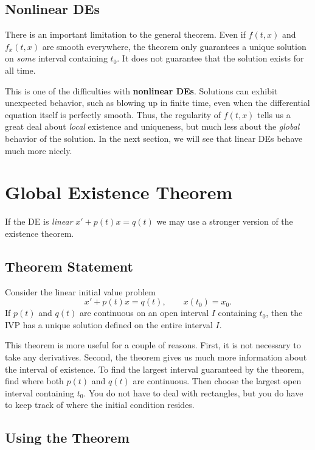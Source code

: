 \documentclass[11pt,letterpaper]{article}
\begin{document}
\subsection{Nonlinear DEs}

There is an important limitation to the general theorem. Even if $f(t,x)$
and $f_x(t,x)$ are smooth everywhere, the theorem only guarantees a unique
solution on \textit{some} interval containing $t_0$. It does not guarantee
that the solution exists for all time.

This is one of the difficulties with \textbf{nonlinear DEs}. Solutions can
exhibit unexpected behavior, such as blowing up in finite time, even when
the differential equation itself is perfectly smooth. Thus, the regularity
of $f(t,x)$ tells us a great deal about \textit{local} existence and
uniqueness, but much less about the \textit{global} behavior of the solution. In the next section, we will see that linear DEs behave much more nicely.

\section{Global Existence Theorem}
If the DE is \textit{linear} $x' + p(t)x = q(t)$ we may use a stronger version of the existence theorem.  

\subsection{Theorem Statement}
\begin{theorem}
Consider the linear initial value problem
\[
x' + p(t)x = q(t), \qquad x(t_0)=x_0.
\]
If $p(t)$ and $q(t)$ are continuous on an open interval $I$ containing
$t_0$, then the IVP has a unique solution defined on the entire interval
$I$.
\end{theorem}
This theorem is more useful for a couple of reasons. First, it is not
necessary to take any derivatives. Second, the theorem gives us much more
information about the interval of existence. To find the largest interval guaranteed by the theorem, find where both
$p(t)$ and $q(t)$ are continuous. Then choose the largest open interval
containing $t_0$. You do not have to deal with rectangles, but you do have
to keep track of where the initial condition resides.


\subsection{Using the Theorem}
\end{document}
